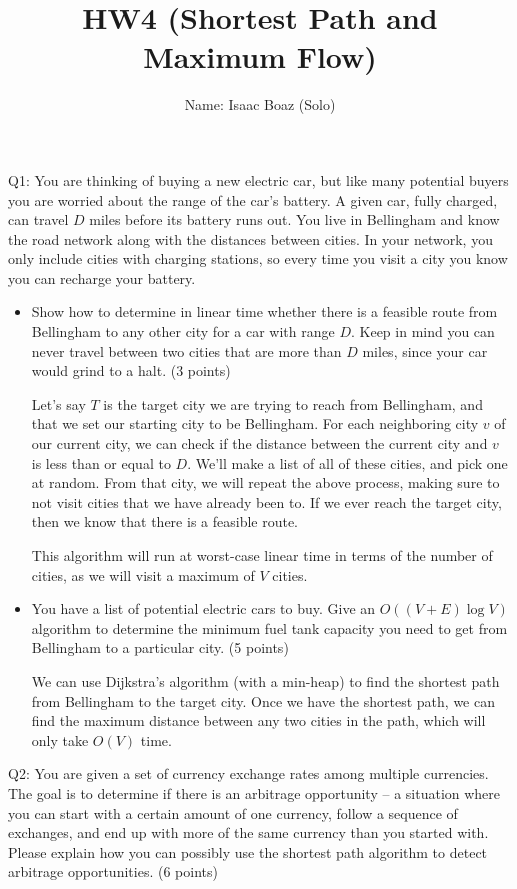 \documentclass[a4paper,12pt]{article}
\title{HW4 (Shortest Path and Maximum Flow)}
\author{Name: Isaac Boaz (Solo)}
\begin{document}
\maketitle

\noindent Q1: You are thinking of buying a new electric car, but like many
potential buyers you are worried about the range of the car's battery. A given
car, fully charged, can travel $D$ miles before its battery runs out. You live
in Bellingham and know the road network along with the distances between cities.
In your network, you only include cities with charging stations, so every time
you visit a city you know you can recharge your battery.
\begin{itemize}
  \item  Show how to determine in linear time whether there is a feasible route
        from Bellingham to any other city for a car with range $D$. Keep in mind
        you can never travel between two cities that are more than $D$ miles,
        since your car would grind to a halt. (3 points)

        Let's say \(T\) is the target city we are trying to reach from
        Bellingham, and that we set our starting city to be Bellingham. For each
        neighboring city \(v\) of our current city, we can check if the distance
        between the current city and $v$ is less than or equal to $D$. We'll
        make a list of all of these cities, and pick one at random. From that
        city, we will repeat the above process, making sure to not visit cities
        that we have already been to. If we ever reach the target city, then we
        know that there is a feasible route.

        This algorithm will run at worst-case linear time in terms of the number
        of cities, as we will visit a maximum of $V$ cities.

  \item  You have a list of potential electric cars to buy. Give an $O((V + E)
          \log V)$ algorithm to determine the minimum fuel tank capacity you need
        to get from Bellingham to a particular city. (5 points)

        We can use Dijkstra's algorithm (with a min-heap) to find the shortest
        path from Bellingham to the target city. Once we have the shortest path,
        we can find the maximum distance between any two cities in the path,
        which will only take \(O(V)\) time.
\end{itemize}

\noindent Q2: You are given a set of currency exchange rates among multiple
currencies. The goal is to determine if there is an arbitrage opportunity – a
situation where you can start with a certain amount of one currency, follow a
sequence of exchanges, and end up with more of the same currency than you
started with. Please explain how you can possibly use the shortest path
algorithm to detect arbitrage opportunities. (6 points) \\
\end{document}
